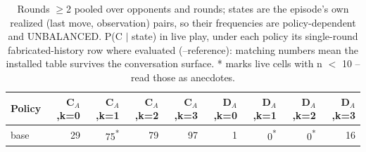 \begin{table}[t]
\centering
\caption{Rounds $\geq$2 pooled over opponents and rounds; states are the episode's own realized (last move, observation) pairs, so their frequencies are policy-dependent and UNBALANCED. P(C $\mid$ state) in live play, under each policy its single-round fabricated-history row where evaluated (--reference): matching numbers mean the installed table survives the conversation surface. * marks live cells with n $<$ 10 -- read those as anecdotes.}
\label{tab:mr-live-states}
\small
\setlength{\tabcolsep}{3.5pt}
\begin{tabular}{lrrrrrrrr}
\toprule
Policy & C$_A$,k=0 & C$_A$,k=1 & C$_A$,k=2 & C$_A$,k=3 & D$_A$,k=0 & D$_A$,k=1 & D$_A$,k=2 & D$_A$,k=3 \\
\midrule
base & 29 & 75\textsuperscript{*} & 79 & 97 & 1 & 0\textsuperscript{*} & 0\textsuperscript{*} & 16 \\
\bottomrule
\end{tabular}
\end{table}
